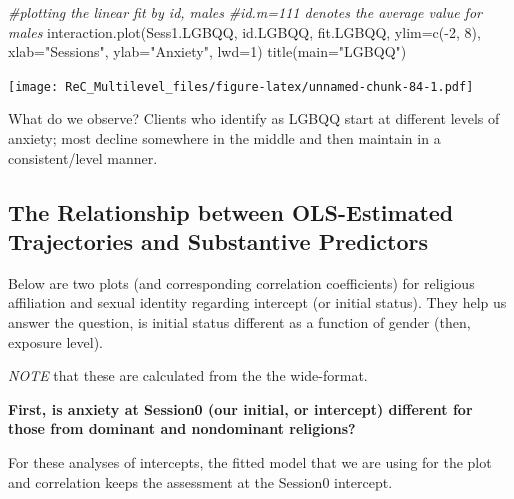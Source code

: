 \documentclass[
  11pt,
]{book}
\newenvironment{Shaded}{\begin{snugshade}}{\end{snugshade}}
\newcommand{\AttributeTok}[1]{\textcolor[rgb]{0.77,0.63,0.00}{#1}}
\newcommand{\CommentTok}[1]{\textcolor[rgb]{0.56,0.35,0.01}{\textit{#1}}}
\newcommand{\DecValTok}[1]{\textcolor[rgb]{0.00,0.00,0.81}{#1}}
\newcommand{\FunctionTok}[1]{\textcolor[rgb]{0.00,0.00,0.00}{#1}}
\newcommand{\NormalTok}[1]{#1}
\newcommand{\SpecialCharTok}[1]{\textcolor[rgb]{0.00,0.00,0.00}{#1}}
\newcommand{\StringTok}[1]{\textcolor[rgb]{0.31,0.60,0.02}{#1}}
\begin{document}
\begin{Shaded}
\begin{Highlighting}[]
\CommentTok{\#plotting the linear fit by id, males}
\CommentTok{\#id.m=111 denotes the average value for males}
\FunctionTok{interaction.plot}\NormalTok{(Sess1.LGBQQ, id.LGBQQ, fit.LGBQQ, }\AttributeTok{ylim=}\FunctionTok{c}\NormalTok{(}\SpecialCharTok{{-}}\DecValTok{2}\NormalTok{, }\DecValTok{8}\NormalTok{), }\AttributeTok{xlab=}\StringTok{"Sessions"}\NormalTok{, }\AttributeTok{ylab=}\StringTok{"Anxiety"}\NormalTok{, }\AttributeTok{lwd=}\DecValTok{1}\NormalTok{)}
\FunctionTok{title}\NormalTok{(}\AttributeTok{main=}\StringTok{"LGBQQ"}\NormalTok{)}
\end{Highlighting}
\end{Shaded}

\texttt{[image: ReC\_Multilevel\_files/figure-latex/unnamed-chunk-84-1.pdf]}

What do we observe? Clients who identify as LGBQQ start at different levels of anxiety; most decline somewhere in the middle and then maintain in a consistent/level manner.

\hypertarget{the-relationship-between-ols-estimated-trajectories-and-substantive-predictors}{%
\subsection{The Relationship between OLS-Estimated Trajectories and Substantive Predictors}\label{the-relationship-between-ols-estimated-trajectories-and-substantive-predictors}}

Below are two plots (and corresponding correlation coefficients) for religious affiliation and sexual identity regarding intercept (or initial status). They help us answer the question, is initial status different as a function of gender (then, exposure level).

\emph{NOTE} that these are calculated from the the wide-format.

\textbf{First, is anxiety at Session0 (our initial, or intercept) different for those from dominant and nondominant religions?}

For these analyses of intercepts, the fitted model that we are using for the plot and correlation keeps the assessment at the Session0 intercept.

\begin{Shaded}
\end{Shaded}
\end{document}
